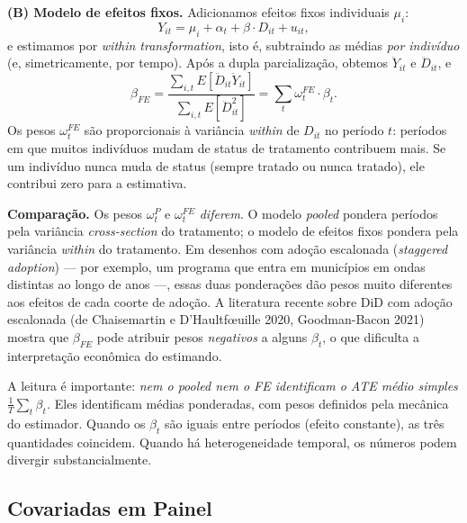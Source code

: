 \textbf{(B) Modelo de efeitos fixos.} Adicionamos efeitos fixos individuais $\mu_i$:
\begin{equation}
Y_{it} = \mu_i + \alpha_t + \beta \cdot D_{it} + u_{it},
\label{eq:efeitos-fixos}
\end{equation}
e estimamos por \textit{within transformation}, isto é, subtraindo as médias \textit{por indivíduo} (e, simetricamente, por tempo). Após a dupla parcialização, obtemos $\ddot{Y}_{it}$ e $\ddot{D}_{it}$, e
\begin{equation}
\beta_{FE} = \frac{\sum_{i,t} E[\ddot{D}_{it} \ddot{Y}_{it}]}{\sum_{i,t} E[\ddot{D}_{it}^2]}
= \sum_t \omega_t^{FE} \cdot \beta_t.
\label{eq:fe-pesos}
\end{equation}
Os pesos $\omega_t^{FE}$ são proporcionais à variância \textit{within} de $D_{it}$ no período $t$: períodos em que muitos indivíduos mudam de status de tratamento contribuem mais. Se um indivíduo nunca muda de status (sempre tratado ou nunca tratado), ele contribui zero para a estimativa.

\textbf{Comparação.} Os pesos $\omega_t^P$ e $\omega_t^{FE}$ \textit{diferem}. O modelo \textit{pooled} pondera períodos pela variância \textit{cross-section} do tratamento; o modelo de efeitos fixos pondera pela variância \textit{within} do tratamento. Em desenhos com adoção escalonada (\textit{staggered adoption}) --- por exemplo, um programa que entra em municípios em ondas distintas ao longo de anos ---, essas duas ponderações dão pesos muito diferentes aos efeitos de cada coorte de adoção. A literatura recente sobre DiD com adoção escalonada (de Chaisemartin e D'Haultfœuille 2020, Goodman-Bacon 2021) mostra que $\beta_{FE}$ pode atribuir pesos \textit{negativos} a alguns $\beta_t$, o que dificulta a interpretação econômica do estimando.

A leitura é importante: \textit{nem o pooled nem o FE identificam o ATE médio simples $\frac{1}{T}\sum_t \beta_t$.} Eles identificam médias ponderadas, com pesos definidos pela mecânica do estimador. Quando os $\beta_t$ são iguais entre períodos (efeito constante), as três quantidades coincidem. Quando há heterogeneidade temporal, os números podem divergir substancialmente.

\subsection{Covariadas em Painel}
\label{subsubsec:covariadas-painel}

